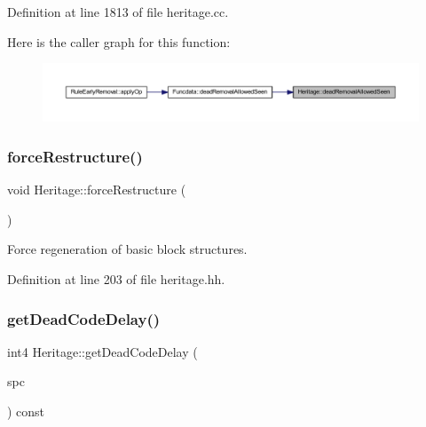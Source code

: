 Definition at line 1813 of file heritage.\+cc.

Here is the caller graph for this function\+:
\nopagebreak
\begin{figure}[H]
\begin{center}
\leavevmode
\includegraphics[width=350pt]{class_heritage_a2bbf92b2085d45de9f3920824a51786c_icgraph}
\end{center}
\end{figure}
\mbox{\label{class_heritage_ad3b79b20f375f99c6ed06fc5941cccd5}} 
\subsubsection{\texorpdfstring{forceRestructure()}{forceRestructure()}}
{\footnotesize\ttfamily void Heritage\+::force\+Restructure (\begin{DoxyParamCaption}\item[{void}]{ }\end{DoxyParamCaption})\hspace{0.3cm}{\ttfamily [inline]}}



Force regeneration of basic block structures. 



Definition at line 203 of file heritage.\+hh.

\mbox{\label{class_heritage_a4f3d2a0674635a527b72ff6b96774f33}} 
\subsubsection{\texorpdfstring{getDeadCodeDelay()}{getDeadCodeDelay()}}
{\footnotesize\ttfamily int4 Heritage\+::get\+Dead\+Code\+Delay (\begin{DoxyParamCaption}\item[{\mbox{\hyperlink{class_addr_space}{Addr\+Space}} $\ast$}]{spc }\end{DoxyParamCaption}) const}



